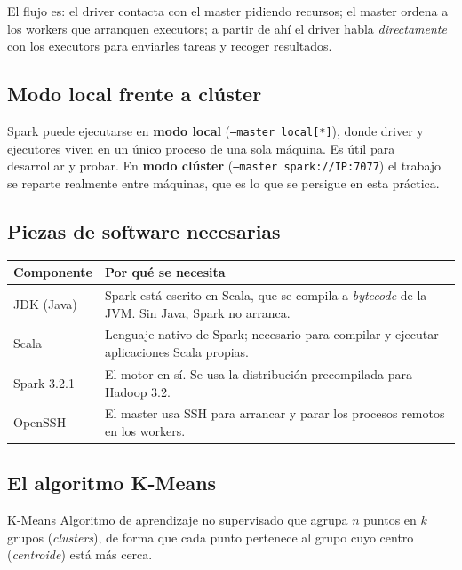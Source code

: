 \documentclass[11pt,a4paper]{article}
\begin{document}
El flujo es: el driver contacta con el master pidiendo recursos; el master ordena a los workers que arranquen executors; a partir de ahí el driver habla \emph{directamente} con los executors para enviarles tareas y recoger resultados.

\subsection{Modo local frente a clúster}

Spark puede ejecutarse en \textbf{modo local} (\texttt{--master local[*]}), donde driver y ejecutores viven en un único proceso de una sola máquina. Es útil para desarrollar y probar. En \textbf{modo clúster} (\texttt{--master spark://IP:7077}) el trabajo se reparte realmente entre máquinas, que es lo que se persigue en esta práctica.

\subsection{Piezas de software necesarias}

\begin{center}
\begin{tabular}{@{}lp{10cm}@{}}
\toprule
\textbf{Componente} & \textbf{Por qué se necesita} \\
\midrule
JDK (Java) & Spark está escrito en Scala, que se compila a \emph{bytecode} de la JVM. Sin Java, Spark no arranca. \\
Scala & Lenguaje nativo de Spark; necesario para compilar y ejecutar aplicaciones Scala propias. \\
Spark 3.2.1 & El motor en sí. Se usa la distribución precompilada para Hadoop 3.2. \\
OpenSSH & El master usa SSH para arrancar y parar los procesos remotos en los workers. \\
\bottomrule
\end{tabular}
\end{center}

\subsection{El algoritmo K-Means}

\begin{concepto}{K-Means}
Algoritmo de aprendizaje no supervisado que agrupa $n$ puntos en $k$ grupos (\emph{clusters}), de forma que cada punto pertenece al grupo cuyo centro (\emph{centroide}) está más cerca.
\end{concepto}
\end{document}

